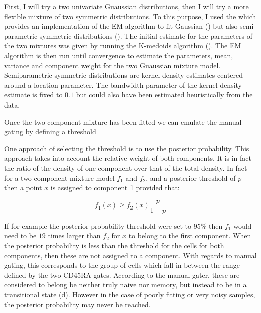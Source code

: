 First, I will try a two univariate Guaussian distributions, then I will try a more flexible mixture of two symmetric distributions.
To this purpose, I used the   which provides an implementation of the \Gls{EM} algorithm \citep{Dempster:1977ul}
to fit Gaussian () but also semi-parametric symmetric distributions ().
The initial estimate for the parameters of the two mixtures was given by running the K-medoids algorithm ().
The EM algorithm is then run until convergence to estimate the parameters, mean, variance and component weight for the two Guaussian mixture model.
Semiparametric symmetric distributions are kernel density estimates centered around a location parameter.
The bandwidth parameter of the kernel density estimate is fixed to $0.1$ but could also have been estimated heuristically from the data.

Once the two component mixture has been fitted 
we can emulate the manual gating by defining a threshold

One approach of selecting the threshold is to use the posterior probability.
This approach takes into account the relative weight of both components.
It is in fact the ratio of the density of one component over that of the total density.
In fact for a two component mixture model $f_1$ and $f_2$, and a posterior threshold of $p$ then a point $x$ is assigned
to component 1 provided that:

\[
  f_1(x) \geq f_2(x) \dfrac{p}{1-p}
\]

If for example the posterior probability threshold were set to $95\%$ then $f_1$ would need to be $19$ times larger than $f_2$ for $x$
to belong to the first component.
When the posterior probability is less than the threshold for the cells for both components,
then these are not assigned to a component.
With regards to manual gating, this corresponds to the group of cells which fall in between the range defined by
the two CD45RA gates.
According to the manual gater, these are considered to belong be neither truly naive nor memory,
but instead to be in a transitional state (d).
However in the case of poorly fitting or very noisy samples, the posterior probability may never be reached.

